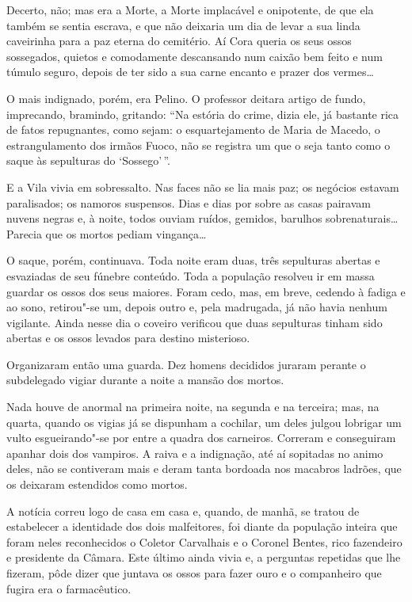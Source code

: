Decerto, não; mas era a Morte, a Morte implacável e onipotente, de que
ela também se sentia escrava, e que não deixaria um dia de levar a sua
linda caveirinha para a paz eterna do cemitério. Aí Cora queria os seus
ossos sossegados, quietos e comodamente descansando num caixão bem feito
e num túmulo seguro, depois de ter sido a sua carne encanto e prazer dos
vermes\ldots{}

O mais indignado, porém, era Pelino. O professor deitara artigo de
fundo, imprecando, bramindo, gritando: ``Na estória do crime, dizia ele,
já bastante rica de fatos repugnantes, como sejam: o esquartejamento de
Maria de Macedo, o estrangulamento dos irmãos Fuoco, não se registra um
que o seja tanto como o saque às sepulturas do `Sossego'\,''.

E a Vila vivia em sobressalto. Nas faces não se lia mais paz; os
negócios estavam paralisados; os namoros suspensos. Dias e dias por
sobre as casas pairavam nuvens negras e, à noite, todos ouviam ruídos,
gemidos, barulhos sobrenaturais\ldots{} Parecia que os mortos pediam
vingança\ldots{}

O saque, porém, continuava. Toda noite eram duas, três sepulturas
abertas e esvaziadas de seu fúnebre conteúdo. Toda a população resolveu
ir em massa guardar os ossos dos seus maiores. Foram cedo, mas, em
breve, cedendo à fadiga e ao sono, retirou"-se um, depois outro e, pela
madrugada, já não havia nenhum vigilante. Ainda nesse dia o coveiro
verificou que duas sepulturas tinham sido abertas e os ossos levados
para destino misterioso.

Organizaram então uma guarda. Dez homens decididos juraram perante o
subdelegado vigiar durante a noite a mansão dos mortos.

Nada houve de anormal na primeira noite, na segunda e na terceira; mas,
na quarta, quando os vigias já se dispunham a cochilar, um deles julgou
lobrigar um vulto esgueirando"-se por entre a quadra dos carneiros.
Correram e conseguiram apanhar dois dos vampiros. A raiva e a
indignação, até aí sopitadas no animo deles, não se contiveram mais e
deram tanta bordoada nos macabros ladrões, que os deixaram estendidos
como mortos.

A notícia correu logo de casa em casa e, quando, de manhã, se tratou de
estabelecer a identidade dos dois malfeitores, foi diante da população
inteira que foram neles reconhecidos o Coletor Carvalhais e o Coronel
Bentes, rico fazendeiro e presidente da Câmara. Este último ainda vivia
e, a perguntas repetidas que lhe fizeram, pôde dizer que juntava os
ossos para fazer ouro e o companheiro que fugira era o farmacêutico.

